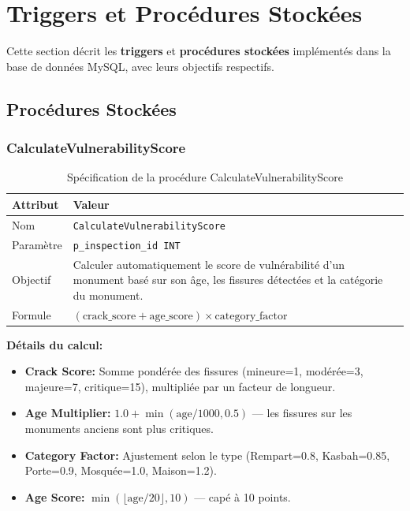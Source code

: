 \documentclass[12pt,a4paper]{article}
\begin{document}
\clearpage
\section{Triggers et Procédures Stockées}

Cette section décrit les \textbf{triggers} et \textbf{procédures stockées} implémentés dans la base de données MySQL, avec leurs objectifs respectifs.

\subsection{Procédures Stockées}

\subsubsection{CalculateVulnerabilityScore}

\begin{table}[H]
\centering
\caption{Spécification de la procédure CalculateVulnerabilityScore}
\begin{tabular}{|p{3cm}|p{10cm}|}
\hline
\textbf{Attribut} & \textbf{Valeur} \\
\hline
Nom & \texttt{CalculateVulnerabilityScore} \\
\hline
Paramètre & \texttt{p\_inspection\_id INT} \\
\hline
Objectif & Calculer automatiquement le score de vulnérabilité d'un monument basé sur son âge, les fissures détectées et la catégorie du monument. \\
\hline
Formule & $(\text{crack\_score} + \text{age\_score}) \times \text{category\_factor}$ \\
\hline
\end{tabular}
\end{table}

\textbf{Détails du calcul:}
\begin{itemize}
    \item \textbf{Crack Score:} Somme pondérée des fissures (mineure=1, modérée=3, majeure=7, critique=15), multipliée par un facteur de longueur.
    \item \textbf{Age Multiplier:} $1.0 + \min(\text{age}/1000, 0.5)$ --- les fissures sur les monuments anciens sont plus critiques.
    \item \textbf{Category Factor:} Ajustement selon le type (Rempart=0.8, Kasbah=0.85, Porte=0.9, Mosquée=1.0, Maison=1.2).
    \item \textbf{Age Score:} $\min(\lfloor\text{age}/20\rfloor, 10)$ --- capé à 10 points.
\end{itemize}
\end{document}
